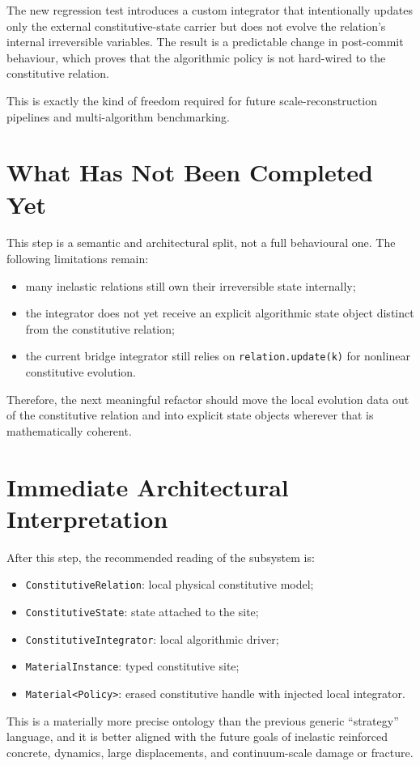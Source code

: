 The new regression test introduces a custom integrator that intentionally
updates only the external constitutive-state carrier but does not evolve the
relation's internal irreversible variables.  The result is a predictable change
in post-commit behaviour, which proves that the algorithmic policy is not
hard-wired to the constitutive relation.

This is exactly the kind of freedom required for future scale-reconstruction
pipelines and multi-algorithm benchmarking.

\section{What Has Not Been Completed Yet}

This step is a semantic and architectural split, not a full behavioural one.
The following limitations remain:

\begin{itemize}
  \item many inelastic relations still own their irreversible state internally;
  \item the integrator does not yet receive an explicit algorithmic state
        object distinct from the constitutive relation;
  \item the current bridge integrator still relies on
        \texttt{relation.update(k)} for nonlinear constitutive evolution.
\end{itemize}

Therefore, the next meaningful refactor should move the local evolution data
out of the constitutive relation and into explicit state objects wherever that
is mathematically coherent.

\section{Immediate Architectural Interpretation}

After this step, the recommended reading of the subsystem is:

\begin{itemize}
  \item \texttt{ConstitutiveRelation}: local physical constitutive model;
  \item \texttt{ConstitutiveState}: state attached to the site;
  \item \texttt{ConstitutiveIntegrator}: local algorithmic driver;
  \item \texttt{MaterialInstance}: typed constitutive site;
  \item \texttt{Material<Policy>}: erased constitutive handle with injected
        local integrator.
\end{itemize}

This is a materially more precise ontology than the previous generic
``strategy'' language, and it is better aligned with the future goals of
inelastic reinforced concrete, dynamics, large displacements, and
continuum-scale damage or fracture.
